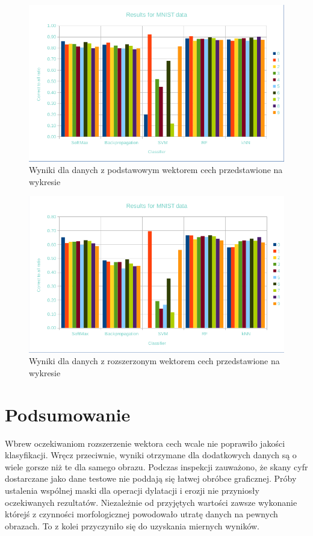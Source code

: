 \documentclass{article}
\begin{document}
\begin{figure}[htp]
	\centering
	\includegraphics[width=1\textwidth]{Figures/basic-vector-summary.png}
	\caption{ Wyniki dla danych z podstawowym wektorem cech przedstawione na wykresie }
	\label{fig:basic-vector-summary}\vspace{-3pt}
\end{figure}

\begin{figure}[htp]
\centering
\includegraphics[width=1\textwidth]{Figures/extended-vector-summary.png}
\caption{ Wyniki dla danych z rozszerzonym wektorem cech przedstawione na wykresie }
\label{fig:extended-vector-summary}\vspace{-3pt}
\end{figure}

\section{Podsumowanie}
Wbrew oczekiwaniom rozszerzenie wektora cech wcale nie poprawiło jakości klasyfikacji. Wręcz przeciwnie, wyniki otrzymane dla dodatkowych danych są o wiele gorsze niż te dla samego obrazu. Podczas inspekcji zauważono, że skany cyfr dostarczane jako dane testowe nie poddają się łatwej obróbce graficznej. Próby ustalenia wspólnej maski dla operacji dylatacji i erozji nie przyniosły oczekiwanych rezultatów. Niezależnie od przyjętych wartości zawsze wykonanie którejś z czynności morfologicznej powodowało utratę danych na pewnych obrazach. To z kolei przyczyniło się do uzyskania miernych wyników.
\end{document}
